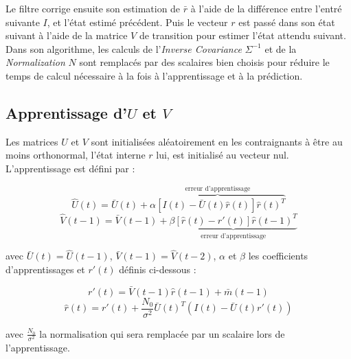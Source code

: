 Le filtre corrige ensuite son estimation de $\bar{r}$ à l'aide de la
différence entre l'entré suivante $I$, et l'état estimé précédent. Puis le
vecteur $r$ est passé dans son état suivant à l'aide de la matrice $V$ de
transition pour estimer l'état attendu suivant.\\

Dans son algorithme, les calculs de l'\textit{Inverse Covariance} $\Sigma^{-1}$
et de la \textit{Normalization} $N$ sont remplacés par des scalaires bien
choisis %
pour réduire le temps de calcul nécessaire à la fois à
l'apprentissage et à la prédiction.


\subsection{Apprentissage d'$U$ et $V$} %
\label{sub:Apprentissage de U et V}

Les matrices $U$ et $V$ sont initialisées aléatoirement en les contraignants
à être au moins orthonormal, l'état interne $r$ lui, est initialisé au vecteur
nul. L'apprentissage est défini par :

\begin{equation}
   \label{eqn:learning_U}
   \hat{U}(t) = \bar{U}(t) + \overbrace{\alpha[I(t) - \bar{U}(t)\hat{r}(t)]\hat{r}(t)^T}^\text{erreur d'apprentissage}
\end{equation}
\begin{equation}
   \label{eqn:learning_V}
   \hat{V}(t-1) = \bar{V}(t-1) + \underbrace{\beta[\hat{r}(t) - r'(t)]\hat{r}(t-1)^T}_\text{erreur d'apprentissage}
\end{equation}

avec $\bar{U}(t) = \hat{U}(t-1)$, $\bar{V}(t-1) = \hat{V}(t-2)$, $\alpha$ et
$\beta$ les coefficients d'apprentissages et $r'(t)$ définis ci-dessous :

\begin{equation}
   \label{eqn:def_r_prime}
   r'(t) =  \bar{V}(t-1)\hat{r}(t-1) + \bar{m}(t-1)
\end{equation}
\begin{equation}
   \label{eqn:def_r_hat}
   \hat{r}(t) = r'(t) + \frac{N_0}{\sigma^2}\bar{U}(t)^T(I(t)-\bar{U}(t)r'(t))
\end{equation}

avec $\frac{N_0}{\sigma^2}$ la normalisation qui sera remplacée par un scalaire lors
de l'apprentissage.


